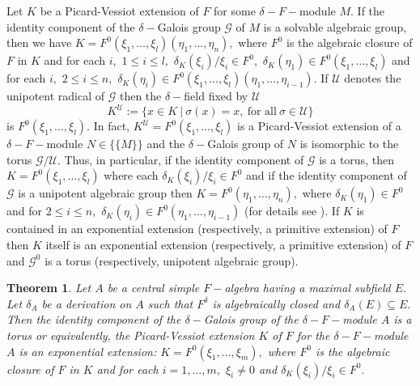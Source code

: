 \documentclass[preprint, 11pt]{amsart}
\newtheorem{theorem}{Theorem}[section]
\theoremstyle{corollary}
\theoremstyle{remark}
\theoremstyle{proposition}
\numberwithin{equation}{subsection}
\begin{document}
Let $K$ be a Picard-Vessiot extension of $F$ for some $\delta-F-$module $M.$ If the identity component of the  $\delta-$Galois group $\mathscr G$ of $M$ is a solvable algebraic group, then we have 
$K=F^0(\xi_1,\dots, \xi_l)(\eta_1,\dots, \eta_n),$ where  $F^0$ is the algebraic  closure of $F$ in $K$ and for each $i,$ $1\leq i \leq l,$  $\delta_K(\xi_i)/\xi _i\in F^0,$  $\delta_K(\eta_1)\in F^0(\xi_1,\dots, \xi_l)$ and for each $i,$ $2\leq i\leq n,$ $\delta_K(\eta_i)\in F^0(\xi_1,\dots, \xi_l)(\eta_1,\dots, \eta_{i-1}).$  If $\mathscr U$ denotes the unipotent radical of $\mathscr{G}$ then the $\delta-$field fixed by $\mathscr U$ $$K^\mathscr U:= \{x\in K\ | \ \sigma(x)=x, \ \text{for all} \ \sigma\in \mathscr U\}$$  is $F^0(\xi_1,\dots, \xi_l).$  
In fact, $K^\mathscr U=F^0(\xi_1,\dots, \xi_l)$ is a Picard-Vessiot extension of a $\delta-F-$module $N\in \{\{M\}\}$ and the $\delta-$Galois group of $N$ is isomorphic to the torus $\mathscr{G}/\mathscr{U}.$ Thus, in particular, if the identity component of $\mathscr G$  is a torus, then $K= F^0(\xi_1,\dots, \xi_l)$ where each $\delta_K(\xi_i)/\xi_i\in F^0$  and if the identity component of $\mathscr G$ is a unipotent algebraic group then $K=F^0(\eta_1,\dots,\eta_n),$ where $\delta_K(\eta_1)\in F^0$ and for $2\leq i\leq n,$ $\delta_K(\eta_i)\in F^0(\eta_1,\dots, \eta_{i-1})$ (for details see \cite[Proposition 6.7, Theorem 6.8]{Mag-94}).  If $K$ is contained in an exponential extension (respectively, a primitive extension) of $F$ then $K$ itself is an exponential extension (respectively, a primitive extension) of $F$ and $\mathscr G^0$ is a torus (respectively, unipotent algebraic group).

\begin{theorem}\label{derivation-maximalsubfields}
	Let $A$ be a central simple $F-$algebra having a maximal subfield $E.$ Let $\delta_A$ be a derivation on $A$ such that $F^{\delta}$ is algebraically closed and  $\delta_A(E)\subseteq E.$ Then  the identity component of the $\delta-$Galois group of the $\delta-F-$module $A$ is a torus or equivalently, the Picard-Vessiot extension $K$ of $F$ for the $\delta-F-$module $A$ is an exponential extension: $K=F^0(\xi_1,\dots, \xi_m),$ where $F^0$ is the algebraic closure of $F$ in $K$ and for each $i=1,\dots, m,$ $\xi_i\neq 0$ and $\delta_K(\xi_i)/\xi_i\in F^0.$
	\end{theorem}
\end{document}
